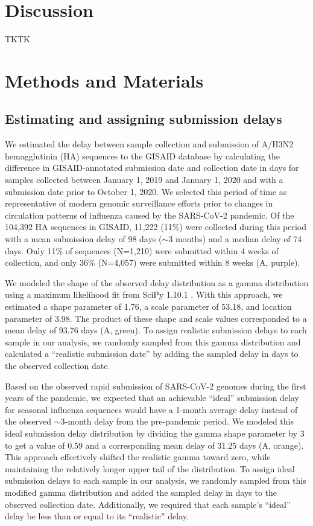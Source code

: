 \documentclass[9pt,lineno]{elife}
\begin{document}
\section{Discussion}

TKTK

\section{Methods and Materials}

\subsection{Estimating and assigning submission delays}

We estimated the delay between sample collection and submission of A/H3N2 hemagglutinin (HA) sequences to the GISAID database \citep{gisaid} by calculating the difference in GISAID-annotated submission date and collection date in days for samples collected between January 1, 2019 and January 1, 2020 and with a submission date prior to October 1, 2020.
We selected this period of time as representative of modern genomic surveillance efforts prior to changes in circulation patterns of influenza caused by the SARS-CoV-2 pandemic.
Of the 104,392 HA sequences in GISAID, 11,222 (11\%) were collected during this period with a mean submission delay of 98 days ($\sim$3 months) and a median delay of 74 days.
Only 11\% of sequences (N=1,210) were submitted within 4 weeks of collection, and only 36\% (N=4,057) were submitted within 8 weeks (A, purple).

We modeled the shape of the observed delay distribution as a gamma distribution using a maximum likelihood fit from SciPy 1.10.1 \citep{scipy}.
With this approach, we estimated a shape parameter of 1.76, a scale parameter of 53.18, and location parameter of 3.98.
The product of these shape and scale values corresponded to a mean delay of 93.76 days (A, green).
To assign realistic submission delays to each sample in our analysis, we randomly sampled from this gamma distribution and calculated a ``realistic submission date'' by adding the sampled delay in days to the observed collection date.

Based on the observed rapid submission of SARS-CoV-2 genomes during the first years of the pandemic, we expected that an achievable ``ideal'' submission delay for seasonal influenza sequences would have a 1-month average delay instead of the observed $\sim$3-month delay from the pre-pandemic period.
We modeled this ideal submission delay distribution by dividing the gamma shape parameter by 3 to get a value of 0.59 and a corresponding mean delay of 31.25 days (A, orange).
This approach effectively shifted the realistic gamma toward zero, while maintaining the relatively longer upper tail of the distribution.
To assign ideal submission delays to each sample in our analysis, we randomly sampled from this modified gamma distribution and added the sampled delay in days to the observed collection date.
Additionally, we required that each sample's ``ideal'' delay be less than or equal to its ``realistic'' delay.
\end{document}

